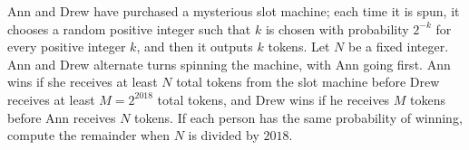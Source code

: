 Ann and Drew have purchased a mysterious slot machine; each time it is spun, it chooses a random positive integer such that $k$ is chosen with probability $2^{-k}$ for every positive integer $k$, and then it outputs $k$ tokens. Let $N$ be a fixed integer. Ann and Drew alternate turns spinning the machine, with Ann going first. Ann wins if she receives at least $N$ total tokens from the slot machine before Drew receives at least $M=2^{2018}$ total tokens, and Drew wins if he receives $M$ tokens before Ann receives $N$ tokens. If each person has the same probability of winning, compute the remainder when $N$ is divided by $2018$.
